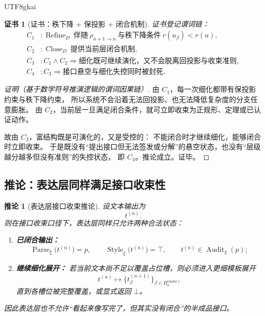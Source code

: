 \documentclass[12pt]{article}
\newtheorem{corollary}{推论}[section]
\newtheorem{Certificate}{证书}[section]
\newcommand{\Parse}{\operatorname{Parse}}
\newcommand{\Audit}{\operatorname{Audit}}
\newcommand{\Refine}{\operatorname{Refine}}
\newcommand{\Close}{\operatorname{Close}}
\newcommand{\Style}{\operatorname{Style}}
\begin{document}
\begin{CJK*}{UTF8}{gkai}
\begin{Certificate}[证书：秩下降 + 保投影 + 闭合机制]
\label{cert:tex37-ch9-evolve}
证书登记谓词链：
\[
\begin{aligned}
  C_1 &: \Refine_D\ \text{伴随}\ \rho_{n+1\to n}\ \text{与秩下降条件}\ r(u_\beta)<r(u),\\
  C_2 &: \Close_D\ \text{提供当前层闭合机制},\\
  C_3 &: C_1\wedge C_2\Rightarrow \text{细化既可继续演化，又不会脱离回投影与收束准则},\\
  C_4 &: C_3\Rightarrow \text{接口悬空与细化失控同时被封死}.
\end{aligned}
\]
\end{Certificate}

\begin{proof}[证明（基于数学符号推演逻辑的谓词因果链）]
由 $C_1$，每一次细化都带有保投影约束与秩下降约束，
所以系统不会沿着无法回投影、也无法降低复杂度的分支任意膨胀。
由 $C_2$，当前层一旦满足闭合条件，就可立即收束为正规形、定理或已认证动作。

故由 $C_3$，富结构既是可演化的，又是受控的：
不能闭合时才继续细化，能够闭合时立即收束。
于是既没有“提出接口但无法签发或分解”的悬空状态，也没有“层级越分越多但没有准则”的失控状态，
即 $C_4$。推论成立。证毕。
\end{proof}

\subsection{推论：表达层同样满足接口收束性}
\label{subsec:tex37-ch9-corollary-render}

\begin{corollary}[表达层接口收束推论]
\label{cor:tex37-ch9-render}
设文本输出为
\[
  t^{(n)}.
\]
则在接口收束口径下，表达层同样只允许两种合法状态：
\begin{enumerate}
  \item \textbf{已闭合输出：}
  \[
    \Parse_\xi\bigl(t^{(n)}\bigr)=p,
    \qquad
    \Style_\xi\bigl(t^{(n)}\bigr)=\top,
    \qquad
    t^{(n)}\in \Audit_\xi(p);
  \]
  \item \textbf{继续细化展开：}
  若当前文本尚不足以覆盖占位槽，则必须进入更细模板展开
  \[
    t^{(n)}
    \longmapsto
    \bigl\{t_\beta^{(n+1)}\bigr\}_{\beta\in B_n^{\mathrm{render}}},
  \]
  直到各槽位被完整覆盖，或显式返回 $\bot$。
\end{enumerate}
因此表达层也不允许“看起来像写完了，但其实没有闭合”的半成品接口。
\end{corollary}


\end{CJK*}
\end{document}
